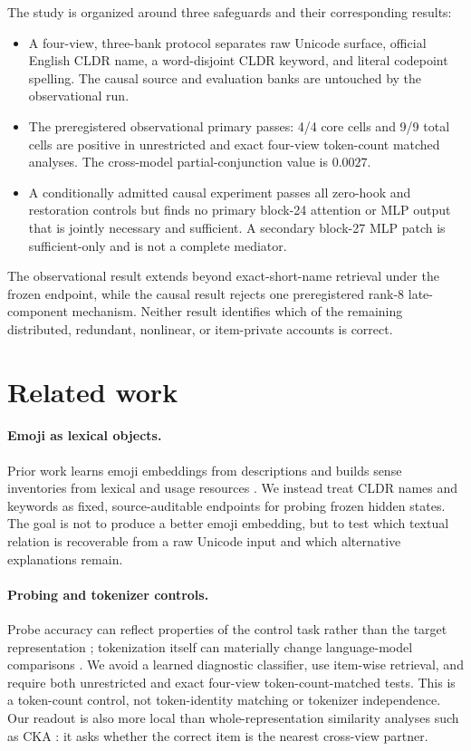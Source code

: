 \documentclass{article}
\begin{document}
The study is organized around three safeguards and their corresponding
results:

\begin{itemize}
  \item A four-view, three-bank protocol separates raw Unicode surface,
  official English CLDR name, a word-disjoint CLDR keyword, and literal
  codepoint spelling. The causal source and evaluation banks are untouched by
  the observational run.
  \item The preregistered observational primary passes: 4/4 core cells and 9/9
  total cells are positive in unrestricted and exact four-view token-count
  matched analyses. The cross-model partial-conjunction value is $0.0027$.
  \item A conditionally admitted causal experiment passes all zero-hook and
  restoration controls but finds no primary block-24 attention or MLP output
  that is jointly necessary and sufficient. A secondary block-27 MLP patch is
  sufficient-only and is not a complete mediator.
\end{itemize}

The observational result extends beyond exact-short-name retrieval under the
frozen endpoint, while the causal result rejects one preregistered rank-8
late-component mechanism. Neither result identifies which of the remaining
distributed, redundant, nonlinear, or item-private accounts is correct.

\section{Related work}

\paragraph{Emoji as lexical objects.}
Prior work learns emoji embeddings from descriptions
\citep{eisner2016emoji2vec} and builds sense inventories from lexical and
usage resources \citep{wijeratne2016emojinet}. We instead treat CLDR names and
keywords \citep{unicode2026cldr} as fixed, source-auditable endpoints for
probing frozen hidden states. The goal is not to produce a better emoji
embedding, but to test which textual relation is recoverable from a raw
Unicode input and which alternative explanations remain.

\paragraph{Probing and tokenizer controls.}
Probe accuracy can reflect properties of the control task rather than the
target representation \citep{hewitt2019designing}; tokenization itself can
materially change language-model comparisons \citep{rust2021tokenizer}. We
avoid a learned diagnostic classifier, use item-wise retrieval, and require
both unrestricted and exact four-view token-count-matched tests. This is a
token-count control, not token-identity matching or tokenizer independence.
Our readout is also more local than whole-representation similarity analyses
such as CKA \citep{kornblith2019similarity}: it asks whether the correct item
is the nearest cross-view partner.
\end{document}
